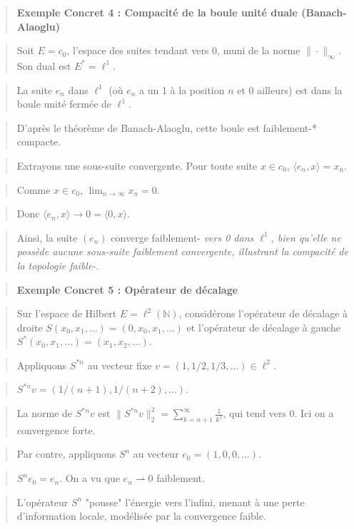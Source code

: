 \documentclass[11pt,a4paper]{article}
\begin{document}
\begin{quote}\textbf{Exemple Concret 4 : Compacité de la boule unité duale (Banach-Alaoglu)}\end{quote}
\begin{quote}Soit $E = c_0$, l'espace des suites tendant vers 0, muni de la norme $\| \cdot \|_\infty$. Son dual est $E^* = \ell^1$.\end{quote}
\begin{quote}La suite $e_n$ dans $\ell^1$ (où $e_n$ a un 1 à la position $n$ et 0 ailleurs) est dans la boule unité fermée de $\ell^1$.\end{quote}
\begin{quote}D'après le théorème de Banach-Alaoglu, cette boule est faiblement-* compacte.\end{quote}
\begin{quote}Extrayons une sous-suite convergente. Pour toute suite $x \in c_0$, $\langle e_n, x \rangle = x_n$.\end{quote}
\begin{quote}Comme $x \in c_0$, $\lim_{n \to \infty} x_n = 0$.\end{quote}
\begin{quote}Donc $\langle e_n, x \rangle \to 0 = \langle 0, x \rangle$.\end{quote}
\begin{quote}Ainsi, la suite $(e_n)$ converge faiblement-\textit{ vers 0 dans $\ell^1$, bien qu'elle ne possède aucune sous-suite faiblement convergente, illustrant la compacité de la topologie faible-}.\end{quote}

\begin{quote}\textbf{Exemple Concret 5 : Opérateur de décalage}\end{quote}
\begin{quote}Sur l'espace de Hilbert $E = \ell^2(\mathbb{N})$, considérons l'opérateur de décalage à droite $S(x_0, x_1, \dots) = (0, x_0, x_1, \dots)$ et l'opérateur de décalage à gauche $S^*(x_0, x_1, \dots) = (x_1, x_2, \dots)$.\end{quote}
\begin{quote}Appliquons $S^{*n}$ au vecteur fixe $v = (1, 1/2, 1/3, \dots) \in \ell^2$.\end{quote}
\begin{quote}$S^{*n} v = (1/(n+1), 1/(n+2), \dots)$.\end{quote}
\begin{quote}La norme de $S^{*n} v$ est $\|S^{*n} v\|_2^2 = \sum_{k=n+1}^\infty \frac{1}{k^2}$, qui tend vers 0. Ici on a convergence forte.\end{quote}
\begin{quote}Par contre, appliquons $S^n$ au vecteur $e_0 = (1, 0, 0, \dots)$.\end{quote}
\begin{quote}$S^n e_0 = e_n$. On a vu que $e_n \rightharpoonup 0$ faiblement.\end{quote}
\begin{quote}L'opérateur $S^n$ "pousse" l'énergie vers l'infini, menant à une perte d'information locale, modélisée par la convergence faible.\end{quote}
\end{document}
